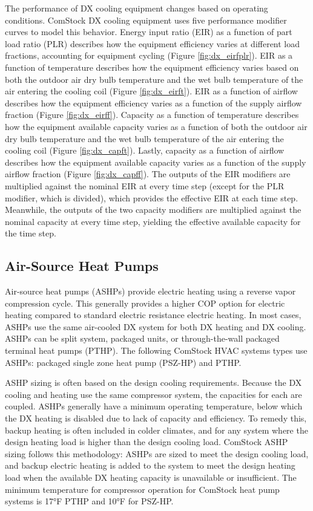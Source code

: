 The performance of DX cooling equipment changes based on operating conditions. ComStock DX cooling equipment uses five performance modifier curves to model this behavior. Energy input ratio (EIR) as a function of part load ratio (PLR) describes how the equipment efficiency varies at different load fractions, accounting for equipment cycling (Figure  \ref{fig:dx_eirfplr}). EIR as a function of temperature describes how the equipment efficiency varies based on both the outdoor air dry bulb temperature and the wet bulb temperature of the air entering the cooling coil (Figure \ref{fig:dx_eirft}). EIR as a function of airflow describes how the equipment efficiency varies as a function of the supply airflow fraction (Figure \ref{fig:dx_eirff}). Capacity as a function of temperature describes how the equipment available capacity varies as a function of both the outdoor air dry bulb temperature and the wet bulb temperature of the air entering the cooling coil (Figure \ref{fig:dx_capft}). Lastly, capacity as a function of airflow describes how the equipment available capacity varies as a function of the supply airflow fraction (Figure \ref{fig:dx_capff}). The outputs of the EIR modifiers are multiplied against the nominal EIR at every time step (except for the PLR modifier, which is divided), which provides the effective EIR at each time step. Meanwhile, the outputs of the two capacity modifiers are multiplied against the nominal capacity at every time step, yielding the effective available capacity for the time step.    


\subsection{Air-Source Heat Pumps}

Air-source heat pumps (ASHPs) provide electric heating using a reverse vapor compression cycle. This generally provides a higher COP option for electric heating compared to standard electric resistance electric heating. In most cases, ASHPs use the same air-cooled DX system for both DX heating and DX cooling. ASHPs can be split system, packaged units, or through-the-wall packaged terminal heat pumps (PTHP). The following ComStock HVAC systems types use ASHPs: packaged single zone heat pump (PSZ-HP) and PTHP.

ASHP sizing is often based on the design cooling requirements. Because the DX cooling and heating use the same compressor system, the capacities for each are coupled. ASHPs generally have a minimum operating temperature, below which the DX heating is disabled due to lack of capacity and efficiency. To remedy this, backup heating is often included in colder climates, and for any system where the design heating load is higher than the design cooling load. ComStock ASHP sizing follows this methodology: ASHPs are sized to meet the design cooling load, and backup electric heating is added to the system to meet the design heating load when the available DX heating capacity is unavailable or insufficient. The minimum temperature for compressor operation for ComStock heat pump systems is 17°F PTHP and 10°F for PSZ-HP.


